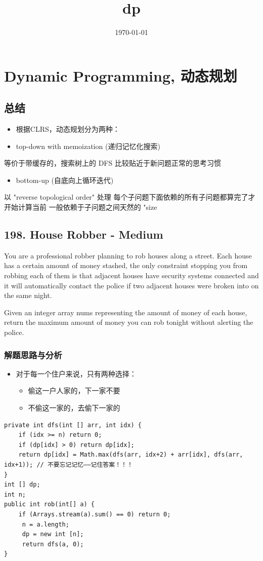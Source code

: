 \documentclass[9pt, b5paaper]{book}
\date{\today}
\title{dp}
\begin{document}
\maketitle
\tableofcontents


\chapter{Dynamic Programming, 动态规划}
\label{sec-1}
\section{总结}
\label{sec-1-1}
\begin{itemize}
\item 根据CLRS，动态规划分为两种：
\item top-down with memoization (递归记忆化搜索)
\end{itemize}
等价于带缓存的，搜索树上的 DFS
比较贴近于新问题正常的思考习惯
\begin{itemize}
\item bottom-up (自底向上循环迭代)
\end{itemize}
以 "reverse topological order" 处理
每个子问题下面依赖的所有子问题都算完了才开始计算当前
一般依赖于子问题之间天然的 "size

\section{198. House Robber - Medium}
\label{sec-1-2}
You are a professional robber planning to rob houses along a street. Each house has a certain amount of money stashed, the only constraint stopping you from robbing each of them is that adjacent houses have security systems connected and it will automatically contact the police if two adjacent houses were broken into on the same night.

Given an integer array nums representing the amount of money of each house, return the maximum amount of money you can rob tonight without alerting the police.
\subsection{解题思路与分析}
\label{sec-1-2-1}
\begin{itemize}
\item 对于每一个住户来说，只有两种选择：
\begin{itemize}
\item 偷这一户人家的，下一家不要
\item 不偷这一家的，去偷下一家的
\end{itemize}
\end{itemize}
\begin{verbatim}
private int dfs(int [] arr, int idx) {
    if (idx >= n) return 0;
    if (dp[idx] > 0) return dp[idx];
    return dp[idx] = Math.max(dfs(arr, idx+2) + arr[idx], dfs(arr, idx+1)); // 不要忘记记忆——记住答案！！！
}
int [] dp;
int n;
public int rob(int[] a) {
    if (Arrays.stream(a).sum() == 0) return 0;
     n = a.length;
     dp = new int [n];
     return dfs(a, 0);
}
\end{verbatim}
\end{document}
